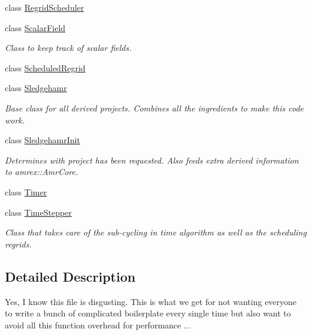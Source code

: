 \begin{DoxyCompactItemize}
class \mbox{\hyperlink{classsledgehamr_1_1RegridScheduler}{Regrid\+Scheduler}}
\item 
class \mbox{\hyperlink{classsledgehamr_1_1ScalarField}{Scalar\+Field}}
\begin{DoxyCompactList}\small\item\em Class to keep track of scalar fields. \end{DoxyCompactList}\item 
class \mbox{\hyperlink{classsledgehamr_1_1ScheduledRegrid}{Scheduled\+Regrid}}
\item 
class \mbox{\hyperlink{classsledgehamr_1_1Sledgehamr}{Sledgehamr}}
\begin{DoxyCompactList}\small\item\em Base class for all derived projects. Combines all the ingredients to make this code work. \end{DoxyCompactList}\item 
class \mbox{\hyperlink{classsledgehamr_1_1SledgehamrInit}{Sledgehamr\+Init}}
\begin{DoxyCompactList}\small\item\em Determines with project has been requested. Also feeds extra derived information to amrex\+::\+Amr\+Core. \end{DoxyCompactList}\item 
class \mbox{\hyperlink{classsledgehamr_1_1Timer}{Timer}}
\item 
class \mbox{\hyperlink{classsledgehamr_1_1TimeStepper}{Time\+Stepper}}
\begin{DoxyCompactList}\small\item\em Class that takes care of the sub-\/cycling in time algorithm as well as the scheduling regrids. \end{DoxyCompactList}\end{DoxyCompactItemize}


\subsection{Detailed Description}
Yes, I know this file is disgusting. This is what we get for not wanting everyone to write a bunch of complicated boilerplate every single time but also want to avoid all this function overhead for performance ... 